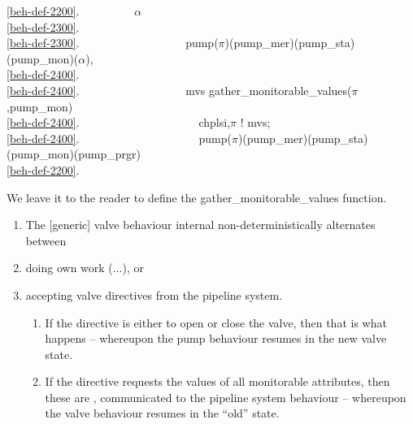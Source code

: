 \ref{beh-def-2200}.\ \ \ \ \ \ \ \ \  $\alpha$ \\
\ref{beh-def-2300}.\ \ \ \ \ \ \ \ \ \ \ \ \  {\VEE} \\
\ref{beh-def-2300}.\ \ \ \ \ \ \ \ \ \ \ \ \ \ \ \ \ \ {\RIGHTARROW} pump($\pi$)(pump\_mer)(pump\_sta)(pump\_mon)($\alpha$)\footnotemark {}, \\
\ref{beh-def-2400}.\ \ \ \ \ \ \ \ \ \ \ \ \ \ \ \\
\ref{beh-def-2400}.\ \ \ \ \ \ \ \ \ \ \ \ \ \ \ \ \ \ {\RIGHTARROW}  mvs {\EQ} gather\_monitorable\_values($\pi$,pump\_mon) \\
\ref{beh-def-2400}.\ \ \ \ \ \ \ \ \ \ \ \ \ \ \ \ \ \ \ \ \ ch{\LBRACKET}{\LBRACE}plsi,$\pi${\RBRACE}{\RBRACKET} ! mvs;\\
\ref{beh-def-2400}.\ \ \ \ \ \ \ \ \ \ \ \ \ \ \ \ \ \ \ \ \ pump($\pi$)(pump\_mer)(pump\_sta)(pump\_mon)(pump\_prgr) \\
\ref{beh-def-2200}.\ \ \ \ \ \ \ \ \ 
\ep
{}

\noindent
\begynd
\pind We leave it to the reader to define the
      \textsf{gather\_monitorable\_values} function.
\afslut


\begin{enumerate}\setei
\item \label{beh-def-3000} The [generic] valve behaviour internal
                           non-deterministically alternates between
\item \label{beh-def-3100} doing own work (...), or
\item \label{beh-def-3200} accepting valve directives from the
                           pipeline system.
\begin{enumerate} 
\item \label{beh-def-3300} If the directive is either to open or close
  the valve, then that is what happens -- whereupon the pump behaviour
  resumes in the new valve state.
\item \label{beh-def-3400} If the directive requests the values of all
  monitorable attributes, then these are , communicated
  to the pipeline system behaviour -- whereupon the valve behaviour
  resumes in the ``old'' state. 
\end{enumerate}
\savei\end{enumerate}

